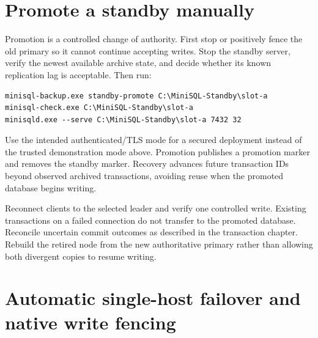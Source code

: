 
\section{Promote a standby manually}

Promotion is a controlled change of authority. First stop or positively fence
the old primary so it cannot continue accepting writes. Stop the standby
server, verify the newest available archive state, and decide whether its
known replication lag is acceptable. Then run:

\begin{lstlisting}
minisql-backup.exe standby-promote C:\MiniSQL-Standby\slot-a
minisql-check.exe C:\MiniSQL-Standby\slot-a
minisqld.exe --serve C:\MiniSQL-Standby\slot-a 7432 32
\end{lstlisting}

Use the intended authenticated/TLS mode for a secured deployment instead of
the trusted demonstration mode above. Promotion publishes a promotion marker
and removes the standby marker. Recovery advances future transaction IDs
beyond observed archived transactions, avoiding reuse when the promoted
database begins writing.

Reconnect clients to the selected leader and verify one controlled write.
Existing transactions on a failed connection do not transfer to the promoted
database. Reconcile uncertain commit outcomes as described in the transaction
chapter. Rebuild the retired node from the new authoritative primary rather
than allowing both divergent copies to resume writing.



\section{Automatic single-host failover and native write fencing}

